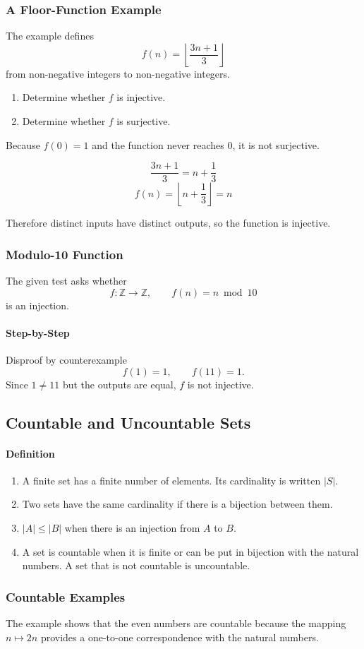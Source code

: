 \documentclass[12pt]{article}
\newcommand{\Definition}{\paragraph{Definition}}
\newcommand{\Step}{\paragraph{Step-by-Step}}
\begin{document}
\subsubsection{A Floor-Function Example}
The example defines
\[
f(n)=\left\lfloor\frac{3n+1}{3}\right\rfloor
\]
from non-negative integers to non-negative integers.
\begin{enumerate}
    \item Determine whether $f$ is injective.
    \item Determine whether $f$ is surjective.
\end{enumerate}

Because $f(0)=1$ and the function never reaches $0$, it is not surjective.

\[
\frac{3n+1}{3}=n+\frac13
\]
\[
f(n)=\left\lfloor n+\frac13\right\rfloor=n
\]

Therefore distinct inputs have distinct outputs, so the function is injective.

\subsubsection{Modulo-10 Function}
The given test asks whether
\[
f:\mathbb Z\rightarrow\mathbb Z,\qquad f(n)=n\bmod10
\]
is an injection.

\Step{Disproof by counterexample}
\[
f(1)=1,\qquad f(11)=1.
\]
Since $1\ne11$ but the outputs are equal, $f$ is not injective.

\subsection{Countable and Uncountable Sets}
\Definition
\begin{enumerate}
    \item A finite set has a finite number of elements. Its cardinality is written $|S|$.
    \item Two sets have the same cardinality if there is a bijection between them.
    \item $|A|\le|B|$ when there is an injection from $A$ to $B$.
    \item A set is countable when it is finite or can be put in bijection with the natural numbers. A set that is not countable is uncountable.
\end{enumerate}

\subsubsection{Countable Examples}
The example shows that the even numbers are countable because the mapping $n\mapsto2n$ provides a one-to-one correspondence with the natural numbers.
\end{document}
